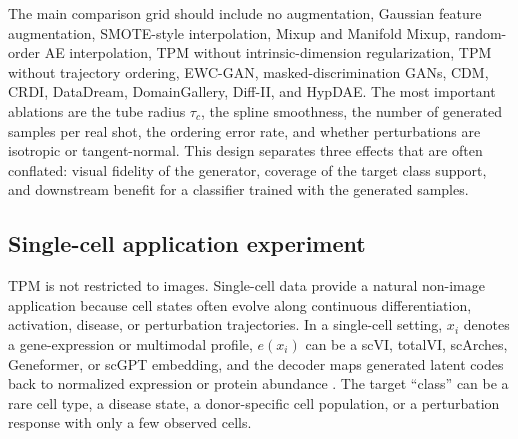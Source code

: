 \documentclass{article}
\def\V#1{\boldsymbol{\mathit#1}}          %
\begin{document}
The main comparison grid should include no augmentation, Gaussian feature augmentation, SMOTE-style interpolation, Mixup and Manifold Mixup, random-order AE interpolation, TPM without intrinsic-dimension regularization, TPM without trajectory ordering, EWC-GAN, masked-discrimination GANs, CDM, CRDI, DataDream, DomainGallery, Diff-II, and HypDAE. The most important ablations are the tube radius $\tau_c$, the spline smoothness, the number of generated samples per real shot, the ordering error rate, and whether perturbations are isotropic or tangent-normal. This design separates three effects that are often conflated: visual fidelity of the generator, coverage of the target class support, and downstream benefit for a classifier trained with the generated samples.

\subsection{Single-cell application experiment}
TPM is not restricted to images. Single-cell data provide a natural non-image application because cell states often evolve along continuous differentiation, activation, disease, or perturbation trajectories. In a single-cell setting, $\V{x}_i$ denotes a gene-expression or multimodal profile, $e(\V{x}_i)$ can be a scVI, totalVI, scArches, Geneformer, or scGPT embedding, and the decoder maps generated latent codes back to normalized expression or protein abundance \citep{lopez2018deep, gayoso2021joint, lotfollahi2022mapping, theodoris2023transfer, cui2024scgpt}. The target ``class'' can be a rare cell type, a disease state, a donor-specific cell population, or a perturbation response with only a few observed cells.
\end{document}

